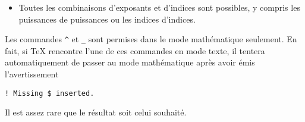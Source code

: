 \begin{itemize}
\begin{trivlist}
\begin{texinput}{0.2\linewidth}
\begin{lstlisting}
x_{i,j}
\end{lstlisting}
    \end{texinput}
    \quad
    \begin{texoutput}{0.1\linewidth}
      $x_{i,j}$
    \end{texoutput}
    \hfill
    \begin{texinput}{0.2\linewidth}
\begin{lstlisting}
x_{ij}^{2n}
\end{lstlisting}
    \end{texinput}
    \quad
    \begin{texoutput}{0.1\linewidth}
      $x_{ij}^{2n}$
    \end{texoutput}
  \end{trivlist}
\item Toutes les combinaisons d'exposants et d'indices sont possibles,
  y compris les puissances de puissances ou les indices d'indices.
\end{itemize}

\begin{important}
  Les commandes \verb=^= et \verb=_= sont permises dans le mode
  mathématique seulement. En fait, si {\TeX} rencontre l'une de ces
  commandes en mode texte, il tentera automatiquement de passer au
  mode mathématique après avoir émis l'avertissement
\begin{verbatim}
! Missing $ inserted.
\end{verbatim}
  Il est assez rare que le résultat soit celui souhaité.
\end{important}

